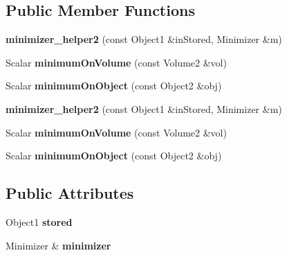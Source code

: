 \subsection*{Public Member Functions}
\begin{DoxyCompactItemize}
\item 
\mbox{\label{struct_eigen_1_1internal_1_1minimizer__helper2_ab58a5115648533c95da67a6bf8c96bdd}} 
{\bfseries minimizer\+\_\+helper2} (const Object1 \&in\+Stored, Minimizer \&m)
\item 
\mbox{\label{struct_eigen_1_1internal_1_1minimizer__helper2_ab9850fb7b3679647697d7c84a3b83798}} 
Scalar {\bfseries minimum\+On\+Volume} (const Volume2 \&vol)
\item 
\mbox{\label{struct_eigen_1_1internal_1_1minimizer__helper2_a0a5c7ce18a1798e42782b58fa792da6b}} 
Scalar {\bfseries minimum\+On\+Object} (const Object2 \&obj)
\item 
\mbox{\label{struct_eigen_1_1internal_1_1minimizer__helper2_ab58a5115648533c95da67a6bf8c96bdd}} 
{\bfseries minimizer\+\_\+helper2} (const Object1 \&in\+Stored, Minimizer \&m)
\item 
\mbox{\label{struct_eigen_1_1internal_1_1minimizer__helper2_ab9850fb7b3679647697d7c84a3b83798}} 
Scalar {\bfseries minimum\+On\+Volume} (const Volume2 \&vol)
\item 
\mbox{\label{struct_eigen_1_1internal_1_1minimizer__helper2_a0a5c7ce18a1798e42782b58fa792da6b}} 
Scalar {\bfseries minimum\+On\+Object} (const Object2 \&obj)
\end{DoxyCompactItemize}
\subsection*{Public Attributes}
\begin{DoxyCompactItemize}
\item 
\mbox{\label{struct_eigen_1_1internal_1_1minimizer__helper2_a0e7aea20192f3f4a70e174b60e4ba9b1}} 
Object1 {\bfseries stored}
\item 
\mbox{\label{struct_eigen_1_1internal_1_1minimizer__helper2_a4c7e3ad4e1491f29646363e4b8a52239}} 
Minimizer \& {\bfseries minimizer}
\end{DoxyCompactItemize}


